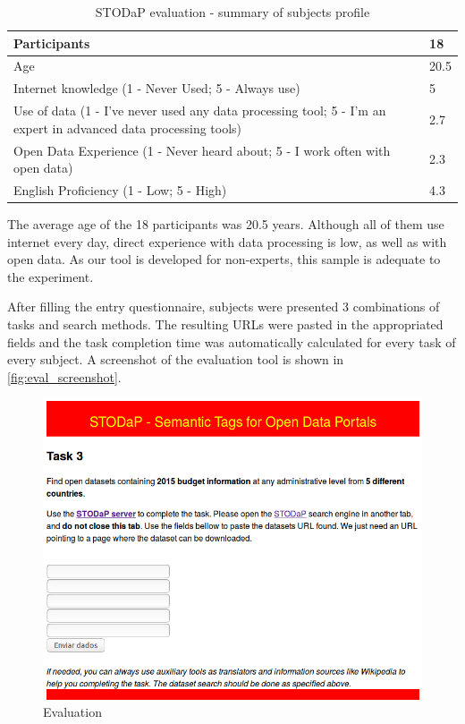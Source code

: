 \begin{table}[]
\ABNTEXfontereduzida
\centering
\caption{STODaP evaluation - summary of subjects profile}
\label{tab:eval_summary}
\begin{tabular}{|p{8cm}|p{2cm}|}
\hline
Participants & 18 \\ \hline
Age & 20.5 \\ \hline
Internet knowledge (1 - Never Used; 5 - Always use) & 5\\ \hline
Use of data (1 - I've never used any data processing tool; 5 - I'm an expert in advanced data processing tools) & 2.7\\ \hline
Open Data Experience (1 - Never heard about; 5 - I work often with open data) & 2.3 \\ \hline
English Proficiency (1 - Low; 5 - High) & 4.3\\ \hline
\end{tabular}
\end{table}

The average age of the 18 participants was 20.5 years.
Although all of them use internet every day, direct experience with data processing is low, as well as with open data.
As our tool is developed for non-experts, this sample is adequate to the experiment.

After filling the entry questionnaire, subjects were presented 3 combinations of tasks and search methods.
The resulting URLs were pasted in the appropriated fields and the task completion time was automatically calculated for every task of every subject.
A screenshot of the evaluation tool is shown in \autoref{fig:eval_screenshot}. 

\begin{figure}[h!]
\begin{center}
\includegraphics[width=\columnwidth]{images/eval_screenshot.png}
\caption[Evaluation]{Evaluation}
\label{fig:eval_screenshot}
\end{center}
\end{figure}

